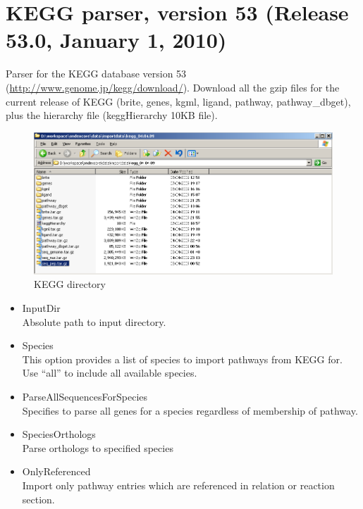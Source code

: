     
\section{KEGG parser, version 53 (Release 53.0, January 1, 2010)}
Parser for the KEGG database version 53 (\url{http://www.genome.jp/kegg/download/}). 
Download all the gzip files for the current release of KEGG (brite, genes, kgml, ligand, pathway, pathway\_dbget), 
plus the hierarchy file (keggHierarchy 10KB file). 
\begin{figure}[htp]
\centering
\includegraphics[scale=0.4]{images/Oct12/kegg_dir.png}
\caption{KEGG directory}
\label{fig:kegg_dir}
\end{figure}

\begin{itemize}
  \item{InputDir}\\
  Absolute path to input directory.
  \item{Species}\\
  This option provides a list of species to import pathways from KEGG for.
  Use ``all'' to include all available species.
  \item{ParseAllSequencesForSpecies}\\
  Specifies to parse all genes for a species regardless of membership of pathway.
  \item{SpeciesOrthologs}\\
  Parse orthologs to specified species
  \item{OnlyReferenced}\\
  Import only pathway entries which are referenced in relation or reaction section.
\end{itemize}
    
